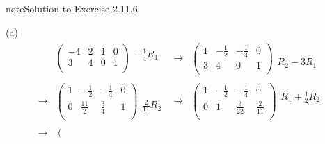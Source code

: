 \documentclass[letterpaper,10pt,english]{jupyterBook}
\begin{document}
\begin{sphinxadmonition}{note}{Solution to Exercise 2.11.6}



\sphinxAtStartPar
(a)
\begin{equation*}
\begin{split} \begin{align*} 
    & \left( \begin{array}{cc|cc} 
         -4 & 2 & 1 & 0 \\ 
         3 & 4 & 0 & 1 \\ 
    \end{array} \right) 
    \begin{array}{l} - \frac{1}{4} R_{1}\\ \phantom{x} \end{array} & 
    \longrightarrow 
    & \left( \begin{array}{cc|cc} 
         1 & - \frac{1}{2} & - \frac{1}{4} & 0 \\ 
         3 & 4 & 0 & 1 \\ 
    \end{array} \right) 
    \begin{array}{l} \phantom{x} \\ R_{2} - 3 R_{1} \end{array} \\ \\ 
    \longrightarrow 
    & \left( \begin{array}{cc|cc} 
         1 & - \frac{1}{2} & - \frac{1}{4} & 0 \\ 
         0 & \frac{11}{2} & \frac{3}{4} & 1 \\ 
    \end{array} \right) 
    \begin{array}{l} \phantom{x} \\ \frac{2}{11} R_{2}\end{array} & 
    \longrightarrow 
    & \left( \begin{array}{cc|cc} 
         1 & - \frac{1}{2} & - \frac{1}{4} & 0 \\ 
         0 & 1 & \frac{3}{22} & \frac{2}{11} \\ 
    \end{array} \right) 
    \begin{array}{l} R_{1} + \frac{1}{2} R_{2}\\ \phantom{x} \end{array} \\ \\ 
    \longrightarrow 
    & \left( \begin{array}{cc|cc} 

\end{array}
\end{align*}
\end{split}
\end{equation*}
\end{sphinxadmonition}
\end{document}
